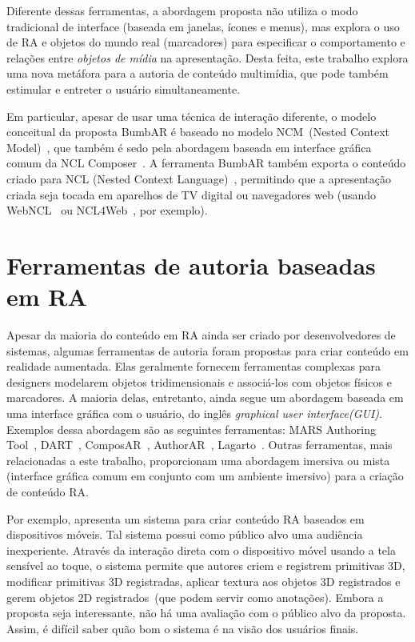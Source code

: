 \documentclass[../main.tex]{subfiles}
\begin{document}
Diferente dessas ferramentas, a abordagem proposta não utiliza o modo tradicional de interface (baseada em janelas, ícones e menus), mas explora o uso de RA e objetos do mundo real (marcadores) para especificar o comportamento e relações entre \emph{objetos de mídia} na apresentação. Desta feita, este trabalho explora uma nova metáfora para a autoria de conteúdo multimídia, que pode também estimular e entreter o usuário simultaneamente.

Em particular, apesar de usar uma técnica de interação diferente, o modelo conceitual da proposta BumbAR é baseado no modelo NCM~(Nested Context Model)~\cite{soares_nested_2005}, que também é sedo pela abordagem baseada em interface gráfica comum da NCL Composer~\cite{azevedo_composer_2014}. A ferramenta BumbAR também exporta o conteúdo criado para NCL (Nested Context Language)~\cite{soares_programando_2009}, permitindo que a apresentação criada seja tocada em aparelhos de TV digital ou navegadores web (usando WebNCL~\cite{melo_webncl_2012} ou NCL4Web~\cite{silva_ncl4web_2013}, por exemplo).

\section{Ferramentas de autoria baseadas em RA}
\label{sec:ferramentas_ra}

Apesar da maioria do conteúdo em RA ainda ser criado por desenvolvedores de sistemas, algumas ferramentas de autoria foram propostas para criar conteúdo em realidade aumentada. Elas geralmente fornecem ferramentas complexas para designers modelarem objetos tridimensionais e associá-los com objetos físicos e marcadores. A maioria delas, entretanto, ainda segue um abordagem baseada em uma interface gráfica com o usuário, do inglês \emph{graphical user interface(GUI)}. Exemplos dessa abordagem são as seguintes ferramentas: MARS Authoring Tool~\cite{sinem_authoring_2003}, DART~\cite{macintyre_dart_2004}, ComposAR~\cite{seichter_composar_2008}, AuthorAR~\cite{lucrecia_authorar_2013}, Lagarto~\cite{maia_lagarto_2017}. Outras ferramentas, mais relacionadas a este trabalho, proporcionam uma abordagem imersiva ou mista (interface gráfica comum em conjunto com um ambiente imersivo) para a criação de conteúdo RA.

Por exemplo,  apresenta um sistema para criar conteúdo RA baseados em dispositivos móveis. Tal sistema possui como público alvo uma audiência inexperiente. Através da interação direta com o dispositivo móvel usando a tela sensível ao toque, o sistema permite que autores criem e registrem primitivas 3D, modificar primitivas 3D registradas, aplicar textura aos objetos 3D registrados e gerem objetos 2D registrados~(que podem servir como anotações). Embora a proposta seja interessante, não há uma avaliação com o público alvo da proposta. Assim, é difícil saber quão bom o sistema é na visão dos usuários finais.
\end{document}
